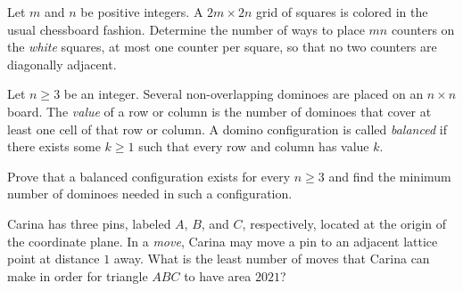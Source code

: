 
\begin{reqproblem}
	Let $m$ and $n$ be positive integers.
	A $2m \times 2n$ grid of squares is colored
	in the usual chessboard fashion.
	Determine the number of ways to place $mn$
	counters on the \emph{white} squares,
	at most one counter per square,
	so that no two counters are diagonally adjacent.
\end{reqproblem} 




\begin{problem}
Let $n \ge 3$ be an integer.
Several non-overlapping dominoes are placed on an $n \times n$ board.
The \emph{value} of a row or column is the number of dominoes
that cover at least one cell of that row or column.
A domino configuration is called \emph{balanced} if there exists
some $k \ge 1$ such that every row and column has value $k$.

Prove that a balanced configuration exists for every $n \ge 3$
and find the minimum number of dominoes needed
in such a configuration.
\end{problem} 



\begin{reqproblem}
	Carina has three pins, labeled $A$, $B$, and $C$, respectively,
	located at the origin of the coordinate plane.
	In a \emph{move}, Carina may move a pin to
	an adjacent lattice point at distance $1$ away.
	What is the least number of moves that Carina can make
	in order for triangle $ABC$ to have area $2021$?
\end{reqproblem} 


